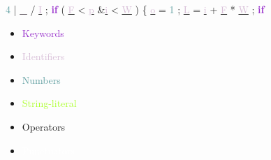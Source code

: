 \documentclass[usenames,dvipsnames]{beamer}
\begin{document}
\begin{frame}
\textcolor{CadetBlue}{4} 
\textcolor{JungleGreen}{|} 
\underline{\textcolor{Thistle}{\_}} 
\textcolor{JungleGreen}{/} 
\underline{\textcolor{Thistle}{I}} 
; 
\textbf{\textcolor{DarkOrchid}{if}} 
( 
\underline{\textcolor{Thistle}{F}} 
\textcolor{JungleGreen}{\textless} 
\underline{\textcolor{Thistle}{p}} 
\textcolor{JungleGreen}{\&}\underline{\textcolor{Thistle}{i}} 
\textcolor{JungleGreen}{\textless} 
\underline{\textcolor{Thistle}{W}} 
) 
\{ 
\underline{\textcolor{Thistle}{o}} 
\textcolor{JungleGreen}{=} 
\textcolor{CadetBlue}{1} 
; 
\underline{\textcolor{Thistle}{L}} 
\textcolor{JungleGreen}{=} 
\underline{\textcolor{Thistle}{i}} 
\textcolor{JungleGreen}{+} 
\underline{\textcolor{Thistle}{F}} 
\textcolor{JungleGreen}{*} 
\underline{\textcolor{Thistle}{W}} 
; 
\textbf{\textcolor{DarkOrchid}{if}} 
\textcolor{black}{ } \newline 
\begin{multicols}{3} 
	 \begin{itemize} 
	 	 \item \textcolor{DarkOrchid}{Keywords} 
	 	 \item \textcolor{Thistle}{Identifiers} 
	 	 \item \textcolor{CadetBlue}{Numbers} 
	 	 \item \textcolor{GreenYellow}{String-literal} 
	 	 \item \textcolor{JungleGreen}{Operators} 
	 	 \item \textcolor{white}{Punctuators} 
	 \end{itemize} 
\end{multicols} 
\end{frame} 
 
\end{document}
